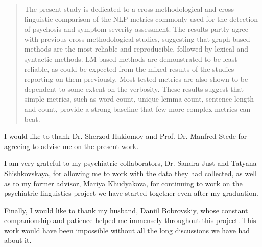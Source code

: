 \documentclass[
12pt, %
oneside, %
english, %
onehalfspacing, %
nolistspacing, %
parskip, %
headsepline, %
]{MastersDoctoralThesis} %
\begin{document}
\cleardoublepage






\begin{abstract}
The present study is dedicated to a cross-methodological and cross-linguistic comparison of the NLP metrics commonly used for the detection of psychosis and symptom severity assessment. The results partly agree with previous cross-methodological studies, suggesting that graph-based methods are the most reliable and reproducible, followed by lexical and syntactic methods. LM-based methods are demonstrated to be least reliable, as could be expected from the mixed results of the studies reporting on them previously. Most tested metrics are also shown to be dependent to some extent on the verbosity. These results suggest that simple metrics, such as word count, unique lemma count, sentence length and count, provide a strong baseline that few more complex metrics can beat.
\end{abstract}


\begin{acknowledgements}
\addchaptertocentry{\acknowledgementname} %
I would like to thank Dr. Sherzod Hakiomov and Prof. Dr. Manfred Stede for agreeing to advise me on the present work. 

I am very grateful to my psychiatric collaborators, Dr. Sandra Just and Tatyana Shishkovskaya, for allowing me to work with the data they had collected, as well as to my former advisor, Mariya Khudyakova, for continuing to work on the psychiatric linguistics project we have started together even after my graduation. 

Finally, I would like to thank my husband, Daniil Bobrovskiy, whose constant companionship and patience helped me immensely throughout this project. This work would have been impossible without all the long discussions we have had about it.
\end{acknowledgements}
\end{document}
